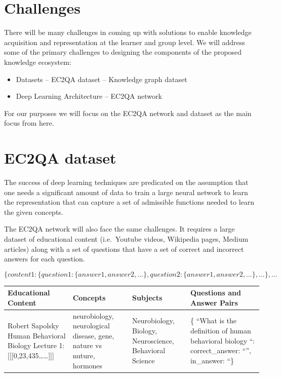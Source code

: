 \documentclass[]{book}
\providecommand{\tightlist}{%
  \setlength{\itemsep}{0pt}\setlength{\parskip}{0pt}}
\theoremstyle{definition}
\theoremstyle{definition}
\theoremstyle{definition}
\theoremstyle{remark}
\begin{document}
\section{Challenges}\label{challenges}

There will be many challenges in coming up with solutions to enable
knowledge acquisition and representation at the learner and group level.
We will address some of the primary challenges to designing the
components of the proposed knowledge ecosystem:

\begin{itemize}
\tightlist
\item
  Datasets -- EC2QA dataset -- Knowledge graph dataset
\item
  Deep Learning Architecture -- EC2QA network
\end{itemize}

For our purposes we will focus on the EC2QA network and dataset as the
main focus from here.

\section{EC2QA dataset}\label{ec2qa-dataset}

The success of deep learning techniques are predicated on the assumption
that one needs a significant amount of data to train a large neural
network to learn the representation that can capture a set of admissible
functions needed to learn the given concepts.

The EC2QA network will also face the same challenges. It requires a
large dataset of educational content (i.e.~Youtube videos, Wikipedia
pages, Medium articles) along with a set of questions that have a set of
correct and incorrect answers for each question.

\[
 \{content1: \{question1: \{answer1, answer2,...\},  question2: \{answer1, answer2,...\},...\},...
\]

\begin{tabular}{l|l|l|l}
\hline
Educational Content & Concepts & Subjects & Questions and Answer Pairs\\
\hline
Robert Sapolsky  Human Behavioral Biology Lecture 1: [[[0,23,435……]]] & neurobiology, neurological disease, gene, nature vs nuture, hormones & Neurobiology, Biology, Neuroscience, Behavioral Science & \{ “What is the definition of human behavioral biology “: correct\_answer: “”, in\_answer: “\}\\
\hline
\end{tabular}
\end{document}
